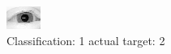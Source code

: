 \begin{figure}[h!]
\begin{center}
\includegraphics[width=0.60\columnwidth]{figures/ID3084_class_1_target_2.png}
\end{center}
\caption{ Classification: 1 actual target: 2}
\label{fig:ID3084_class_1_target_2}
\end{figure}
